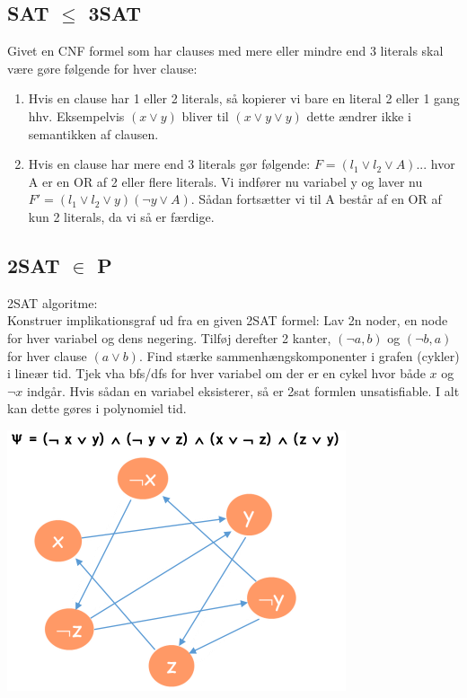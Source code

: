 \documentclass{article}
\begin{document}
\subsection{SAT $\le$ 3SAT}
Givet en CNF formel som har clauses med mere eller mindre end 3 literals skal være gøre følgende for hver clause:\\
\begin{enumerate}
    \item Hvis en clause har 1 eller 2 literals, så kopierer vi bare en literal 2 eller 1 gang hhv. Eksempelvis $(x\lor y)$ bliver til $(x \lor y \lor y)$ dette ændrer ikke i semantikken af clausen.
    \item Hvis en clause har mere end 3 literals gør følgende: $ F = (l_1 \lor l_2 \lor A)...$ hvor A er en OR af 2 eller flere literals. Vi indfører nu variabel y og laver nu $F' = (l_1 \lor l_2 \lor y) (\lnot y \lor A)$. Sådan fortsætter vi til A består af en OR af kun  2 literals, da vi så er færdige.
\end{enumerate}

\subsection{2SAT $\in$ P}
2SAT algoritme:\\
Konstruer implikationsgraf ud fra en given 2SAT formel: Lav 2n noder, en node for hver variabel og dens negering. Tilføj derefter 2 kanter, $(\lnot a, b)$ og $(\lnot b,a)$ for hver clause $(a \lor b)$. Find stærke sammenhængskomponenter i grafen (cykler) i lineær tid. Tjek vha bfs/dfs for hver variabel om der er en cykel hvor både $x$ og $\lnot x$ indgår. Hvis sådan en variabel eksisterer, så er 2sat formlen unsatisfiable. I alt kan dette gøres i polynomiel tid.
\begin{center}
    \includegraphics[scale=0.7]{2sat2}
\end{center}
\end{document}
